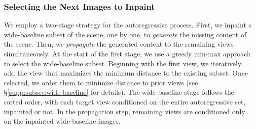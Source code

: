 \subsubsection{Selecting the Next Images to Inpaint}
\label{subsubsec:next-images}

We employ a two-stage strategy for the autoregressive process. First, we inpaint a wide-baseline subset of the scene, one by one,
to \textit{generate} the missing content of the scene. Then, we \textit{propagate} the generated content to the remaining views simultaneously.
At the start of
the first stage, we use a greedy min-max approach to select the wide-baseline subset. Beginning with the first view, we iteratively add the view that maximizes the minimum distance to the
existing subset.
Once selected, we order them to minimize distance to prior views
(see \S\ref{supp:subsec:wide-baseline} for details).
The wide-baseline stage
follows the
sorted order,
with each target view conditioned on the entire autoregressive set,
inpainted or not.
In the propagation step, 
remaining views
are conditioned only on the inpainted wide-baseline images.
